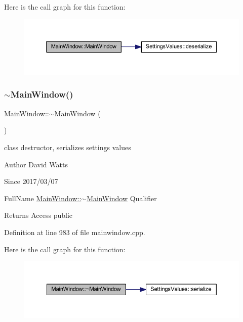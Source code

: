 Here is the call graph for this function\+:
\nopagebreak
\begin{figure}[H]
\begin{center}
\leavevmode
\includegraphics[width=350pt]{class_main_window_a8b244be8b7b7db1b08de2a2acb9409db_cgraph}
\end{center}
\end{figure}
\mbox{\label{class_main_window_ae98d00a93bc118200eeef9f9bba1dba7}} 
\subsubsection{\texorpdfstring{$\sim$\+Main\+Window()}{~MainWindow()}}
{\footnotesize\ttfamily Main\+Window\+::$\sim$\+Main\+Window (\begin{DoxyParamCaption}{ }\end{DoxyParamCaption})}

class destructor, serializes settings values

\begin{DoxyAuthor}{Author}
David Watts 
\end{DoxyAuthor}
\begin{DoxySince}{Since}
2017/03/07
\end{DoxySince}
Full\+Name \hyperlink{class_main_window_ae98d00a93bc118200eeef9f9bba1dba7}{Main\+Window\+::$\sim$\+Main\+Window} Qualifier \begin{DoxyReturn}{Returns}
Access public 
\end{DoxyReturn}


Definition at line 983 of file mainwindow.\+cpp.

Here is the call graph for this function\+:
\nopagebreak
\begin{figure}[H]
\begin{center}
\leavevmode
\includegraphics[width=350pt]{class_main_window_ae98d00a93bc118200eeef9f9bba1dba7_cgraph}
\end{center}
\end{figure}


